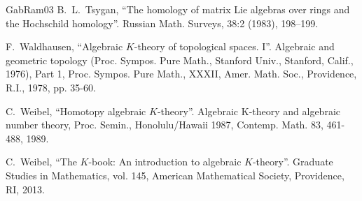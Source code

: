 \documentclass[11pt,leqno]{amsart}
\numberwithin{equation}{section}
\begin{document}
\begin{thebibliography}{GabRam03}
 B.~L.~Tsygan, ``The homology of matrix Lie algebras over rings and the Hochschild homology''. Russian Math. Surveys, 38:2 (1983), 198–199.


F.~Waldhausen, ``Algebraic $K$-theory of topological spaces. I''. Algebraic and geometric topology (Proc.
Sympos. Pure Math., Stanford Univ., Stanford, Calif., 1976), Part 1, Proc. Sympos. Pure Math.,
XXXII, Amer. Math. Soc., Providence, R.I., 1978, pp. 35-60.





 C.~Weibel, ``Homotopy algebraic $K$-theory''. Algebraic K-theory and algebraic number theory,
Proc. Semin., Honolulu/Hawaii 1987, Contemp. Math. 83, 461-488, 1989.

 C.~Weibel, ``The $K$-book: An introduction to algebraic $K$-theory''.  Graduate Studies in Mathematics, vol. 145, American Mathematical Society, Providence, RI, 2013.


\end{thebibliography}
\end{document}
